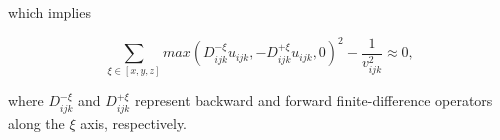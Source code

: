 	\noindent which implies
	
	\begin{equation}
		\sum_{\xi \in \left[x, y, z\right]} max\left(D^{-\xi}_{ijk}u_{ijk}, -D^{+\xi}_{ijk}u_{ijk}, 0 \right)^2 - \frac{1}{v^2_{ijk}} \approx 0,
	\end{equation}
	
	where $D^{-\xi}_{ijk}$ and $D^{+\xi}_{ijk}$ represent backward and forward finite-difference operators along the $\xi$ axis, respectively. 
%	 
%	
%	
%	
	\par